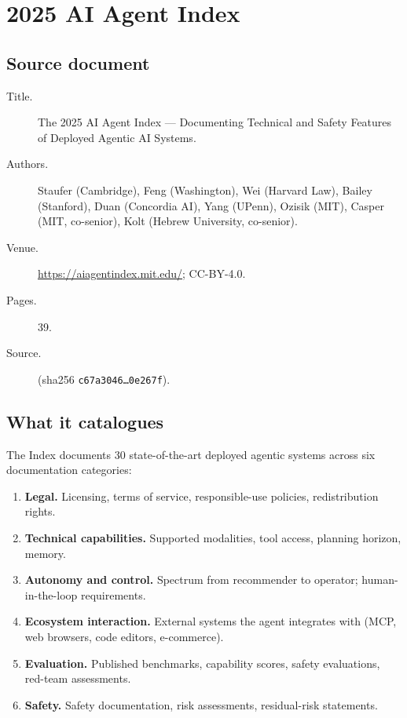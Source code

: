 \chapter{2025 AI Agent Index}
\label{ch:agent-index}

\section{Source document}

\begin{description}
  \item[Title.] The 2025 AI Agent Index --- Documenting Technical and Safety
    Features of Deployed Agentic AI Systems.
  \item[Authors.] Staufer (Cambridge), Feng (Washington), Wei (Harvard
    Law), Bailey (Stanford), Duan (Concordia AI), Yang (UPenn), Ozisik
    (MIT), Casper (MIT, co-senior), Kolt (Hebrew University, co-senior).
  \item[Venue.] \url{https://aiagentindex.mit.edu/}; CC-BY-4.0.
  \item[Pages.] 39.
  \item[Source.] 
    (sha256 \texttt{c67a3046\ldots0e267f}).
\end{description}

\section{What it catalogues}

The Index documents 30 state-of-the-art deployed agentic systems across
six documentation categories:

\begin{enumerate}
  \item \textbf{Legal.} Licensing, terms of service, responsible-use
        policies, redistribution rights.
  \item \textbf{Technical capabilities.} Supported modalities, tool
        access, planning horizon, memory.
  \item \textbf{Autonomy and control.} Spectrum from recommender to
        operator; human-in-the-loop requirements.
  \item \textbf{Ecosystem interaction.} External systems the agent
        integrates with (MCP, web browsers, code editors, e-commerce).
  \item \textbf{Evaluation.} Published benchmarks, capability scores,
        safety evaluations, red-team assessments.
  \item \textbf{Safety.} Safety documentation, risk assessments,
        residual-risk statements.
\end{enumerate}

